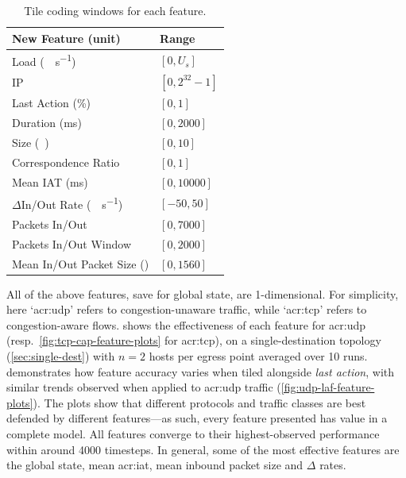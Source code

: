 \begin{table}
	\centering
	\caption{Tile coding windows for each feature.\label{tab:codings}}
	
	\begin{tabular}{@{}ll@{}}
		\toprule
		New Feature (unit) & Range \\
		\midrule
		Load (\unit{\mega\bit\per\second}) & $[0, U_s]$ \\
		IP & $[0, 2^{32}-1]$ \\
		Last Action (\unit{\percent}) & $[0, 1]$ \\
		Duration (\unit{\milli\second}) & $[0, \num{2000}]$ \\
		Size (\unit{\mebi\byte}) & $[0,10]$ \\
		Correspondence Ratio & $[0,1]$ \\
		Mean IAT (\unit{\milli\second}) & $[0, \num{10000}]$ \\
		$\Delta$In/Out Rate (\unit{\mega\bit\per\second}) & $[-50, 50]$ \\
		Packets In/Out & $[0, 7000]$ \\
		Packets In/Out Window & $[0, 2000]$ \\
		Mean In/Out Packet Size (\unit{\byte}) & $[0, 1560]$ \\
		\bottomrule
	\end{tabular}
\end{table}

All of the above features, save for global state, are 1-dimensional.
For simplicity, here `\gls{acr:udp}' refers to congestion-unaware traffic, while `\gls{acr:tcp}' refers to congestion-aware flows.
 shows the effectiveness of each feature for \gls{acr:udp} (resp.\ \cref{fig:tcp-cap-feature-plots} for \gls{acr:tcp}), on a single-destination topology (\cref{sec:single-dest}) with $n=2$ hosts per egress point averaged over \num{10} runs.
 demonstrates how feature accuracy varies when tiled alongside \emph{last action}, with similar trends observed when applied to \gls{acr:udp} traffic (\cref{fig:udp-laf-feature-plots}).
The plots show that different protocols and traffic classes are best defended by different features---as such, every feature presented has value in a complete model.
All features converge to their highest-observed performance within around \num{4000} timesteps.
In general, some of the most effective features are the global state, mean \gls{acr:iat}, mean inbound packet size and $\Delta$ rates.
